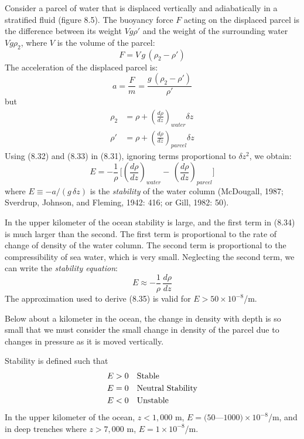 Consider a parcel of water that is displaced vertically and adiabatically in a
stratified fluid (figure 8.5). The buoyancy force $F$ acting on the displaced
parcel is the difference between its weight $V g \rho '$ and the weight of the surrounding
water
$V g \rho_2$, where $V$ is the volume of the parcel:
\begin{displaymath}
F=V\,g\,(\rho_2-\rho{'})
\end{displaymath}
The acceleration of the displaced parcel is:
\begin{equation}
a=\frac{F}{m}=\frac{g\,(\rho_2-\rho{'})}{\rho{'}}
\end{equation}
but
\begin{align}
\rho_2  &= \rho + \left( \frac{d {\rho}}{d {z}}\right)_{water}
\delta z \\
\rho{'} &= \rho + \left( \frac{d {\rho}}{d {z}}\right)_{parcel}
\delta z
\end{align}
Using (8.32) and (8.33) in (8.31), ignoring terms proportional to
$\delta{z^2}$, we obtain:
\begin{equation}
E = -\frac{1}{\rho}\,\Biggl[\left(\frac{d \rho}{d {z}}\right)_{water}
- \,\left(\frac{d \rho}{d {z}}\right)_{parcel}\Biggr]
\end{equation}
where $E \equiv -a/(g \, \delta z)$ is the
\textit{stability} of the water column (McDougall, 1987;
Sverdrup, Johnson, and Fleming, 1942: 416; or Gill, 1982: 50).

In the upper kilometer of the ocean stability is large, and the first term in (8.34)
is much larger than the second. The first term is proportional to the rate of
change of density of the water column. The second term is proportional to the
compressibility of sea water, which is very small. Neglecting the second term, we
can write the
\textit{stability equation}:
\begin{equation}
\boxed{E \approx -\frac{1}{\rho}\,\frac{d{\rho}}{d{z}} }
\end{equation}
The approximation used to derive (8.35) is valid for $E > 50 \times
10^{-8}$/m.

Below about a kilometer in the ocean, the change in density with depth is so small
that we must consider the small change in density of the parcel due to changes in
pressure as it is moved vertically.

Stability is defined such that
\begin{align}
E>0 & \quad \text{Stable} \notag \\
E=0 & \quad \text{Neutral Stability} \notag \\
E<0 & \quad \text{Unstable} \notag
\end{align}
In the upper kilometer of the ocean, $z < 1,000$ m, $E = (50$---$1000) \times
10^{-8}$/m, and in deep trenches where $z > 7,000$ m, $E = 1 \times 10^{-8}$/m.

